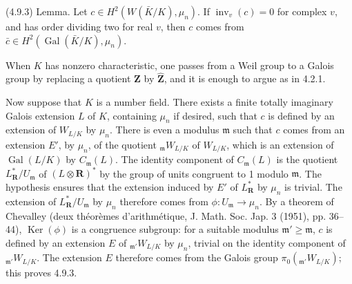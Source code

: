 \documentclass[9pt,twoside]{extarticle}
\begin{document}
{(4.9.3) Lemma. Let \(c\in H^2(W(\bar K/K),\mu_n)\). If \(\operatorname{inv}_v(c)=0\) for complex \(v\), and has order dividing two for real \(v\), then \(c\) comes from \(\bar c\in H^2(\operatorname{Gal}(\bar K/K),\mu_n)\).\par

When \(K\) has nonzero characteristic, one passes from a Weil group to a Galois group by replacing a quotient \(\mathbf Z\) by \(\widehat{\mathbf Z}\), and it is enough to argue as in 4.2.1.\par

Now suppose that \(K\) is a number field. There exists a finite totally imaginary Galois extension \(L\) of \(K\), containing \(\mu_n\) if desired, such that \(c\) is defined by an extension of \(W_{L/K}\) by \(\mu_n\). There is even a modulus \(\mathfrak m\) such that \(c\) comes from an extension \(E'\), by \(\mu_n\), of the quotient \({}_{\mathfrak m}W_{L/K}\) of \(W_{L/K}\), which is an extension of \(\operatorname{Gal}(L/K)\) by \(C_{\mathfrak m}(L)\). The identity component of \(C_{\mathfrak m}(L)\) is the quotient \(L_{\mathbf R}^*/U_{\mathfrak m}\) of \((L\otimes\mathbf R)^*\) by the group of units congruent to 1 modulo \(\mathfrak m\). The hypothesis ensures that the extension induced by \(E'\) of \(L_{\mathbf R}^*\) by \(\mu_n\) is trivial. The extension of \(L_{\mathbf R}^*/U_{\mathfrak m}\) by \(\mu_n\) therefore comes from \(\phi:U_{\mathfrak m}\to\mu_n\). By a theorem of Chevalley (deux théorèmes d’arithmétique, J. Math. Soc. Jap. 3 (1951), pp. 36--44), \(\operatorname{Ker}(\phi)\) is a congruence subgroup: for a suitable modulus \(\mathfrak m'\ge\mathfrak m\), \(c\) is defined by an extension \(E\) of \({}_{\mathfrak m'}W_{L/K}\) by \(\mu_n\), trivial on the identity component of \({}_{\mathfrak m'}W_{L/K}\). The extension \(E\) therefore comes from the Galois group \(\pi_0({}_{\mathfrak m'}W_{L/K})\); this proves 4.9.3.\par
}
\end{document}
